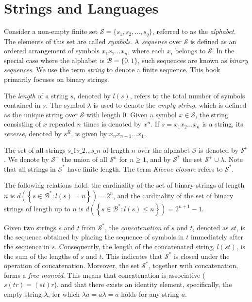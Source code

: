 %
%

\section{Strings and Languages}
\label{sec:strings}

Consider a non-empty finite set $\mathcal{S} = \{ s_1, s_2, \ldots, s_q \}$, referred to as the \emph{alphabet}. The elements of this set are called \emph{symbols}. A \emph{sequence} over $\mathcal{S}$ is defined as an ordered arrangement of symbols $x_1 x_2 \dots x_n$, where each $x_i$ belongs to $\mathcal{S}$. In the special case where the alphabet is $\mathcal{B} = \{0, 1\}$, such sequences are known as \emph{binary sequences}. We use the term \emph{string} to denote a finite sequence. This book primarily focuses on binary strings.

The \emph{length} of a string $s$, denoted by $l(s)$, refers to the total number of symbols contained in $s$. The symbol $\lambda$ is used to denote the \emph{empty string}, which is defined as the unique string over $\mathcal{S}$ with length 0. Given a symbol $x \in \mathcal{S}$, the string consisting of $x$ repeated $n$ times is denoted by $x^n$. If $s = x_1 x_2 \dots x_n$ is a string, its \emph{reverse}, denoted by $s^R$, is given by $x_n x_{n-1} \dots x_1$.

The set of all strings $s\_{1}s\_{2}\ldots s\_{n}$ of length $n$ over the alphabet $\mathcal{S}$ is denoted by $\mathcal{S}^{n}$. We denote by $\mathcal{S}^{+}$ the union of all $\mathcal{S}^{n}$ for $n \geq 1$, and by $\mathcal{S}^{\ast}$ the set $\mathcal{S}^{+} \cup {\lambda}$. Note that all strings in $\mathcal{S}^{\ast}$ have finite length. The term \emph{Kleene closure} refers to $\mathcal{S}^{\ast}$.

\begin{example}
The following relations hold: the cardinality of the set of binary strings of length $n$ is $d \left( \left\{ s \in \mathcal{B}^{\ast} : l(s) = n \right\} \right) = 2^n$, and the cardinality of the set of binary strings of length up to $n$ is $d \left( \left\{ s \in \mathcal{B}^{\ast} : l(s) \leq n \right\} \right) = 2^{n+1}-1$.
\end{example}

Given two strings $s$ and $t$ from $\mathcal{S}^{\ast}$, the \emph{concatenation} of $s$ and $t$, denoted as $st$, is the sequence obtained by placing the sequence of symbols in $t$ immediately after the sequence in $s$. Consequently, the length of the concatenated string, $l(st)$, is the sum of the lengths of $s$ and $t$. This indicates that $\mathcal{S}^\ast$ is closed under the operation of concatenation. Moreover, the set $\mathcal{S}^\ast$, together with concatenation, forms a \emph{free monoid}. This means that concatenation is associative ($s(tr) = (st)r$), and that there exists an identity element, specifically, the empty string $\lambda$, for which $\lambda a = a \lambda = a$ holds for any string $a$.

